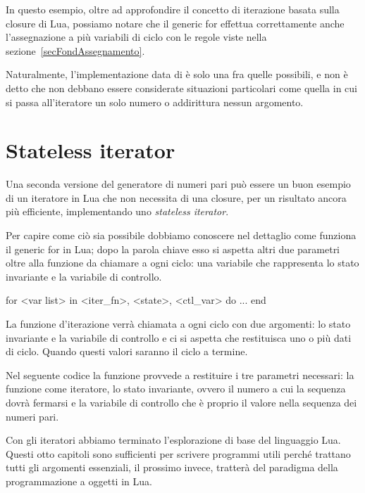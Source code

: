 In questo esempio, oltre ad approfondire il concetto di iterazione basata sulla
closure di Lua, possiamo notare che il generic for effettua correttamente anche
l'assegnazione a più variabili di ciclo con le regole viste nella
sezione~\ref{secFondAssegnamento}.

Naturalmente, l'implementazione data di  è solo una fra quelle
possibili, e non è detto che non debbano essere considerate situazioni
particolari come quella in cui si passa all'iteratore un solo numero o
addirittura nessun argomento.


\section{Stateless iterator}
\label{secFondStatelessIter}

Una seconda versione del generatore di numeri pari può essere un buon esempio
di un iteratore in Lua che non necessita di una closure, per un risultato ancora
più efficiente, implementando uno \emph{stateless iterator}.

Per capire come ciò sia possibile dobbiamo conoscere nel dettaglio come funziona
il generic for in Lua; dopo la parola chiave  esso si aspetta
altri due parametri oltre alla funzione da chiamare a ogni ciclo: una variabile
che rappresenta lo stato invariante e la variabile di controllo.
\begin{lines}
for <var list> in <iter_fn>, <state>, <ctl_var> do
    ...
end
\end{lines}

La funzione d'iterazione verrà chiamata a ogni ciclo con due argomenti: lo stato
invariante e la variabile di controllo e ci si aspetta che restituisca uno o più
dati di ciclo. Quando questi valori saranno  il ciclo a termine.

Nel seguente codice la funzione  provvede a restituire i tre
parametri necessari: la funzione  come iteratore, lo stato
invariante, ovvero il numero a cui la sequenza dovrà fermarsi e la variabile di
controllo che è proprio il valore nella sequenza dei numeri pari.

Con gli iteratori abbiamo terminato l'esplorazione di base del linguaggio Lua.
Questi otto capitoli sono sufficienti per scrivere programmi utili perché
trattano tutti gli argomenti essenziali, il prossimo invece, tratterà del
paradigma della programmazione a oggetti in Lua.


